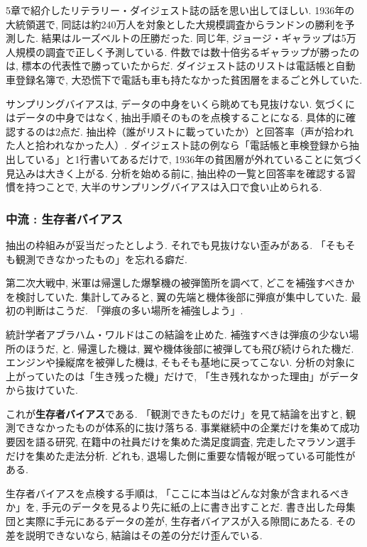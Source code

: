 5章で紹介したリテラリー・ダイジェスト誌の話を思い出してほしい.
1936年の大統領選で, 同誌は約240万人を対象とした大規模調査からランドンの勝利を予測した.
結果はルーズベルトの圧勝だった. 同じ年, ジョージ・ギャラップは5万人規模の調査で正しく予測している.
件数では数十倍劣るギャラップが勝ったのは, 標本の代表性で勝っていたからだ.
ダイジェスト誌のリストは電話帳と自動車登録名簿で, 大恐慌下で電話も車も持たなかった貧困層をまるごと外していた.

サンプリングバイアスは, データの中身をいくら眺めても見抜けない.
気づくにはデータの中身ではなく, 抽出手順そのものを点検することになる.
具体的に確認するのは2点だ. 抽出枠（誰がリストに載っていたか）と回答率（声が拾われた人と拾われなかった人）.
ダイジェスト誌の例なら「電話帳と車検登録から抽出している」と1行書いてあるだけで, 1936年の貧困層が外れていることに気づく見込みは大きく上がる.
分析を始める前に, 抽出枠の一覧と回答率を確認する習慣を持つことで, 大半のサンプリングバイアスは入口で食い止められる.

\subsubsection*{中流 : 生存者バイアス}

抽出の枠組みが妥当だったとしよう. それでも見抜けない歪みがある.
「そもそも観測できなかったもの」を忘れる癖だ.

第二次大戦中, 米軍は帰還した爆撃機の被弾箇所を調べて, どこを補強すべきかを検討していた.
集計してみると, 翼の先端と機体後部に弾痕が集中していた.
最初の判断はこうだ. 「弾痕の多い場所を補強しよう」.

統計学者アブラハム・ワルドはこの結論を止めた.
補強すべきは弾痕の少ない場所のほうだ, と.
帰還した機は, 翼や機体後部に被弾しても飛び続けられた機だ.
エンジンや操縦席を被弾した機は, そもそも基地に戻ってこない.
分析の対象に上がっていたのは「生き残った機」だけで, 「生き残れなかった理由」がデータから抜けていた.

これが\textbf{生存者バイアス}である.
「観測できたものだけ」を見て結論を出すと, 観測できなかったものが体系的に抜け落ちる.
事業継続中の企業だけを集めて成功要因を語る研究, 在籍中の社員だけを集めた満足度調査, 完走したマラソン選手だけを集めた走法分析.
どれも, 退場した側に重要な情報が眠っている可能性がある.

生存者バイアスを点検する手順は, 「ここに本当はどんな対象が含まれるべきか」を, 手元のデータを見るより先に紙の上に書き出すことだ.
書き出した母集団と実際に手元にあるデータの差が, 生存者バイアスが入る隙間にあたる.
その差を説明できないなら, 結論はその差の分だけ歪んでいる.

